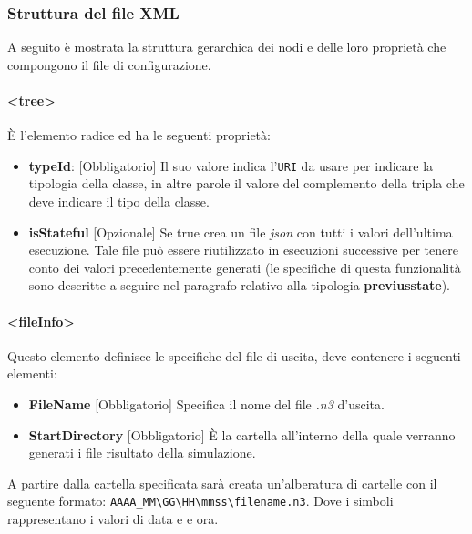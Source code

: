 \documentclass[12pt,a4paper,italian]{article}
\begin{document}
\subsubsection{Struttura del file XML}
A seguito è mostrata la struttura gerarchica dei nodi e delle loro proprietà che compongono il file di configurazione.\\


\paragraph{\large{<tree>}}
\`E l'elemento radice ed ha le seguenti proprietà:
\begin{itemize}
	\item \textbf{typeId}: [Obbligatorio] Il suo valore indica l'\texttt{URI} da usare per indicare la tipologia della classe, in altre parole il valore del complemento della tripla 
	che deve indicare il tipo della classe.
	\item \textbf{isStateful} [Opzionale] Se true crea un file \emph{json} con tutti i valori dell'ultima esecuzione. Tale file può essere riutilizzato in esecuzioni successive per tenere conto dei valori 
	precedentemente generati (le specifiche di questa funzionalità sono descritte a seguire nel paragrafo relativo alla tipologia \textbf{previusstate}). 
\end{itemize}
\paragraph{\large{<fileInfo>}}
Questo elemento definisce le specifiche del file di uscita, deve contenere i seguenti elementi:
\begin{itemize}
	\item \textbf{FileName} [Obbligatorio] Specifica il nome del file \emph{.n3} d'uscita.
	\item \textbf{StartDirectory} [Obbligatorio] \`E la cartella all'interno della quale verranno generati i file risultato della simulazione.
\end{itemize}
A partire dalla cartella specificata sarà creata un'alberatura di cartelle con il seguente formato: \texttt{AAAA\_MM\textbackslash GG\textbackslash HH\textbackslash mmss\textbackslash filename.n3}.
Dove i simboli rappresentano i valori di data e e ora.
\end{document}
